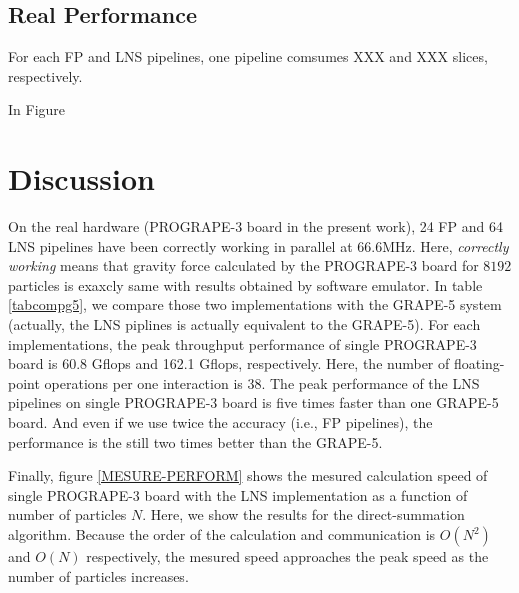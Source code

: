 \documentclass{llncs}
\begin{document}
\subsection{Real Performance}



For each FP and LNS pipelines, one pipeline comsumes XXX and XXX slices, respectively.

In Figure 








\section{Discussion}



On the real hardware (PROGRAPE-3 board in the present work), 
24 FP and 64 LNS pipelines have been correctly working in parallel at 66.6MHz.
Here, {\it correctly working} means that gravity force calculated by
the PROGRAPE-3 board for $8192$ particles is exaxcly same with results
obtained by software emulator.
In table \ref{tabcompg5}, we compare those two implementations
with the GRAPE-5 system\cite{KFMT00}
(actually, the LNS piplines is actually equivalent to the GRAPE-5).
For each implementations, the peak throughput performance 
of single PROGRAPE-3 board is 60.8 Gflops and 162.1 Gflops, respectively.
Here, the number of floating-point operations per one interaction is 38.
The peak performance of the LNS pipelines on single PROGRAPE-3
board is five times faster than one GRAPE-5 board.
And even if we use twice the accuracy (i.e., FP pipelines),
the performance is the still two times better than the GRAPE-5.

Finally, figure \ref{MESURE-PERFORM} shows the mesured calculation speed of
single PROGRAPE-3 board with the LNS implementation as a function of 
number of particles $N$. Here, we show the results for the direct-summation algorithm.
Because the order of the calculation and communication is $O(N^2)$ and $O(N)$
respectively, the mesured speed approaches the peak speed as the
number of particles increases.
\end{document}
